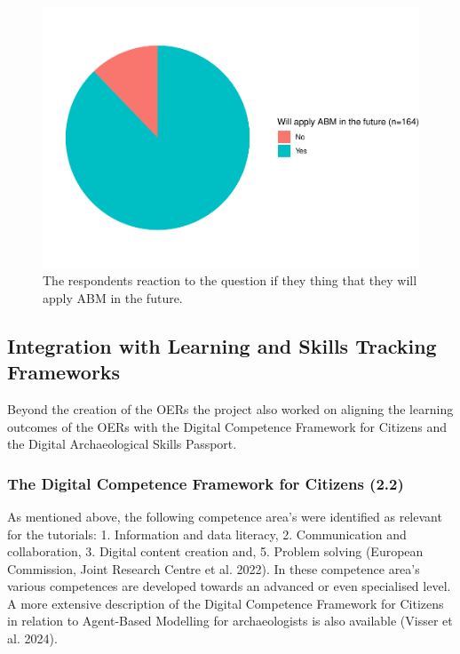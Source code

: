 \documentclass[
]{article}
\begin{document}
\begin{figure}
\includegraphics[height=0.5\textheight]{paper_files/figure-latex/future-abm-1} \caption{The respondents reaction to the question if they thing that they will apply ABM in the future.}\label{fig:future-abm}
\end{figure}

\hypertarget{integration-with-learning-and-skills-tracking-frameworks}{%
\subsection{Integration with Learning and Skills Tracking Frameworks}\label{integration-with-learning-and-skills-tracking-frameworks}}

Beyond the creation of the OERs the project also worked on aligning the learning outcomes of the OERs with the Digital Competence Framework for Citizens and the Digital Archaeological Skills Passport.

\hypertarget{the-digital-competence-framework-for-citizens-2.2}{%
\subsubsection{The Digital Competence Framework for Citizens (2.2)}\label{the-digital-competence-framework-for-citizens-2.2}}

As mentioned above, the following competence area's were identified as relevant for the tutorials: 1. Information and data literacy, 2. Communication and collaboration, 3. Digital content creation and, 5. Problem solving (European Commission, Joint Research Centre et al. 2022). In these competence area's various competences are developed towards an advanced or even specialised level. A more extensive description of the Digital Competence Framework for Citizens in relation to Agent-Based Modelling for archaeologists is also available (Visser et al. 2024).
\end{document}
